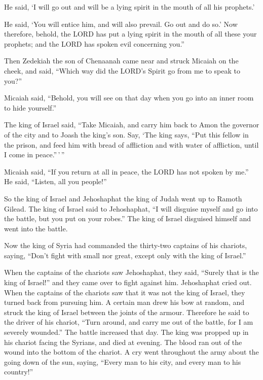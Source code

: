 He said, `I will go out and will be a lying spirit in the mouth of all
his prophets.'

He said, `You will entice him, and will also prevail. Go out and do so.'
 Now therefore, behold, the LORD has put a lying spirit
in the mouth of all these your prophets; and the LORD has spoken evil
concerning you.''

 Then Zedekiah the son of Chenaanah came near and struck
Micaiah on the cheek, and said, ``Which way did the LORD's Spirit go
from me to speak to you?''

 Micaiah said, ``Behold, you will see on that day when
you go into an inner room to hide yourself.''

 The king of Israel said, ``Take Micaiah, and carry him
back to Amon the governor of the city and to Joash the king's son.
 Say, `The king says, ``Put this fellow in the prison,
and feed him with bread of affliction and with water of affliction,
until I come in peace.''\,'\,''

 Micaiah said, ``If you return at all in peace, the LORD
has not spoken by me.'' He said, ``Listen, all you people!''

 So the king of Israel and Jehoshaphat the king of Judah
went up to Ramoth Gilead.  The king of Israel said to
Jehoshaphat, ``I will disguise myself and go into the battle, but you
put on your robes.'' The king of Israel disguised himself and went into
the battle.

 Now the king of Syria had commanded the thirty-two
captains of his chariots, saying, ``Don't fight with small nor great,
except only with the king of Israel.''

 When the captains of the chariots saw Jehoshaphat, they
said, ``Surely that is the king of Israel!'' and they came over to fight
against him. Jehoshaphat cried out.  When the captains of
the chariots saw that it was not the king of Israel, they turned back
from pursuing him.  A certain man drew his bow at random,
and struck the king of Israel between the joints of the armour.
Therefore he said to the driver of his chariot, ``Turn around, and carry
me out of the battle, for I am severely wounded.''  The
battle increased that day. The king was propped up in his chariot facing
the Syrians, and died at evening. The blood ran out of the wound into
the bottom of the chariot.  A cry went throughout the
army about the going down of the sun, saying, ``Every man to his city,
and every man to his country!''

